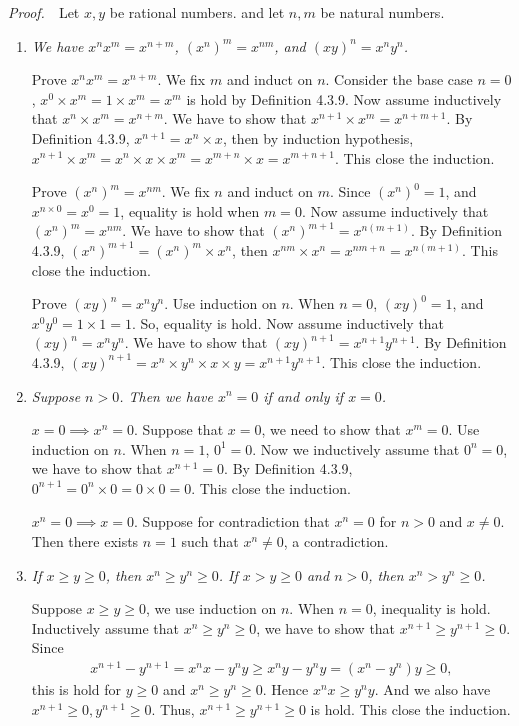 \documentclass{book}
\newcommand{\pff}{\vspace{.25em}\noindent\emph{Proof.}~~}
\begin{document}
\pff Let $x,y$ be rational numbers. and let $n,m$ be natural numbers.
\begin{enumerate}
    \item \emph{We have $x^nx^m=x^{n+m}$, $(x^n)^m=x^{nm}$, and $(xy)^n=x^ny^n$.}

    Prove $x^nx^m=x^{n+m}$. We fix $m$ and induct on $n$. Consider the base case $n=0$, $x^0\times x^m=1\times x^m=x^{m}$ is hold by Definition 4.3.9. Now assume inductively that $x^n\times x^m=x^{n+m}$. We have to show that $x^{n+1}\times x^m=x^{n+m+1}$. By Definition 4.3.9, $x^{n+1}=x^n\times x$, then by induction hypothesis, $x^{n+1}\times x^m=x^n\times x\times x^m=x^{m+n}\times x=x^{m+n+1}$. This close the induction.

    Prove $(x^n)^m=x^{nm}$. We fix $n$ and induct on $m$. Since $(x^n)^0=1$, and $x^{n\times 0}=x^0=1$, equality is hold when $m=0$. Now assume inductively that $(x^n)^m=x^{nm}$. We have to show that $(x^n)^{m+1}=x^{n(m+1)}$. By Definition 4.3.9, $(x^n)^{m+1}=(x^n)^m\times x^n$, then $x^{nm}\times x^n=x^{nm+n}=x^{n(m+1)}$. This close the induction.

    Prove $(xy)^n=x^ny^n$. Use induction on $n$. When $n=0$, $(xy)^0=1$, and $x^0y^0=1\times 1=1$. So, equality is hold. Now assume inductively that $(xy)^n=x^ny^n$. We have to show that $(xy)^{n+1}=x^{n+1}y^{n+1}$. By Definition 4.3.9, $(xy)^{n+1}=x^n\times y^n\times x\times y=x^{n+1}y^{n+1}$. This close the induction.

    \item \emph{Suppose $n>0$. Then we have $x^n=0$ if and only if $x=0$.}

    $x=0\implies x^n=0$. Suppose that $x=0$, we need to show that $x^m=0$. Use induction on $n$. When $n=1$, $0^1=0$. Now we inductively assume that $0^n=0$, we have to show that $x^{n+1}=0$. By Definition 4.3.9, $0^{n+1}=0^n\times 0=0\times 0=0$. This close the induction.

    $x^n=0\implies x=0$. Suppose for contradiction that $x^n=0$ for $n>0$ and $x\ne0$. Then there exists $n=1$ such that $x^n\ne0$, a contradiction.

    \item \emph{If $x\geq y\geq 0$, then $x^n\geq y^n\geq 0$. If $x>y\geq 0$ and $n>0$, then $x^n>y^n\geq 0$.}

    Suppose $x\geq y\geq 0$, we use induction on $n$. When $n=0$, inequality is hold. Inductively assume that $x^n\geq y^n\geq 0$, we have to show that $x^{n+1}\geq y^{n+1}\geq 0$. Since
       \begin{align*}
        x^{n+1}-y^{n+1}=x^nx-y^ny\geq x^ny-y^ny
        =(x^n-y^n)y\geq 0,
       \end{align*}
    this is hold for $y\geq 0$ and $x^n\geq y^n\geq 0$. Hence $x^nx\geq y^ny$. And we also have $x^{n+1}\geq 0,y^{n+1}\geq 0$. Thus, $x^{n+1}\geq y^{n+1}\geq 0$ is hold. This close the induction.


\end{enumerate}
\end{document}
